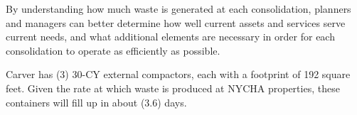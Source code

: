 
    By understanding how much waste is generated at each consolidation, planners and managers
    can better determine how well current assets and services serve current needs, and what additional 
    elements are necessary in order for each consolidation to operate as efficiently as possible. 

    Carver has (3) 30-CY external compactors, each with a footprint of 192 square feet. Given the rate at which waste is produced at NYCHA properties, these containers will fill
    up in about (3.6) days.